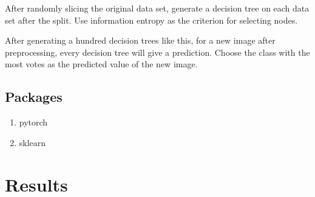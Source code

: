 \documentclass{article}
\begin{document}
  After randomly slicing the original data set, generate a decision tree on each data set after the split. Use information entropy as the criterion for selecting nodes.

  After generating a hundred decision trees like this, for a new image after preprocessing, every decision tree will give a prediction. Choose the class with the most votes as the predicted value of the new image.

  \subsection{Packages}
  \begin{enumerate}
    \item pytorch
    \item sklearn
  \end{enumerate}

\section{Results}
\end{document}
